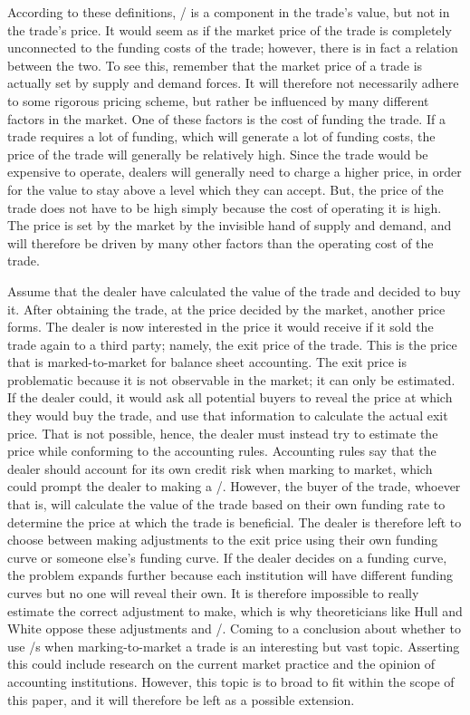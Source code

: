 \documentclass[main.tex]{subfiles}
\begin{document}
    According to these definitions, 
    \FVA/ is a component in the trade's value, but not in the trade's price. 
    It would seem as if the market price of the trade 
    is completely unconnected to the funding costs of the trade;
    however, there is in fact a relation between the two. 
    To see this, remember that the market price of a trade 
    is actually set by supply and demand forces.
    It will therefore not necessarily adhere to some rigorous pricing scheme,
    but rather be influenced by many different factors in the market.
    One of these factors is the cost of funding the trade.
    If a trade requires a lot of funding, which will generate a lot of funding costs,
    the price of the trade will generally be relatively high.
    Since the trade would be expensive to operate, 
    dealers will generally need to charge a higher price, 
    in order for the value to stay above a level which they can accept.
    But, the price of the trade does not have to be high 
    simply because the cost of operating it is high.
    The price is set by the market by the invisible hand of supply and demand,
    and will therefore be driven by many other factors than the operating cost of the trade.

    Assume that the dealer have calculated the value of the trade and decided to buy it.
    After obtaining the trade, at the price decided by the market, another price forms. 
    The dealer is now interested in the price it would receive 
    if it sold the trade again to a third party; namely, the exit price of the trade.
    This is the price that is marked-to-market for balance sheet accounting.
    The exit price is problematic because it is not observable in the market; 
    it can only be estimated.
    If the dealer could, it would ask all potential buyers to reveal the price 
    at which they would buy the trade, and use that information to calculate the actual exit price.
    That is not possible, hence, the dealer must instead try to estimate the price
    while conforming to the accounting rules.
    Accounting rules say that the dealer should account for its own credit risk 
    when marking to market, which could prompt the dealer to making a \DVA/.
    However, the buyer of the trade, whoever that is, will calculate the value of the trade
    based on their own funding rate to determine the price at which the trade is beneficial.
    The dealer is therefore left to choose between making adjustments to the exit price
    using their own funding curve or someone else's funding curve.
    If the dealer decides on a funding curve, the problem expands further
    because each institution will have different funding curves but no one will reveal their own.
    It is therefore impossible to really estimate the correct adjustment to make,
    which is why theoreticians like Hull and White oppose these adjustments and \FVA/.
    Coming to a conclusion about whether to use \FVA/s when marking-to-market a trade
    is an interesting but vast topic.
    Asserting this could include research on the current market practice and
    the opinion of accounting institutions.
    However, this topic is to broad to fit within the scope of this paper,
    and it will therefore be left as a possible extension.
\end{document}
